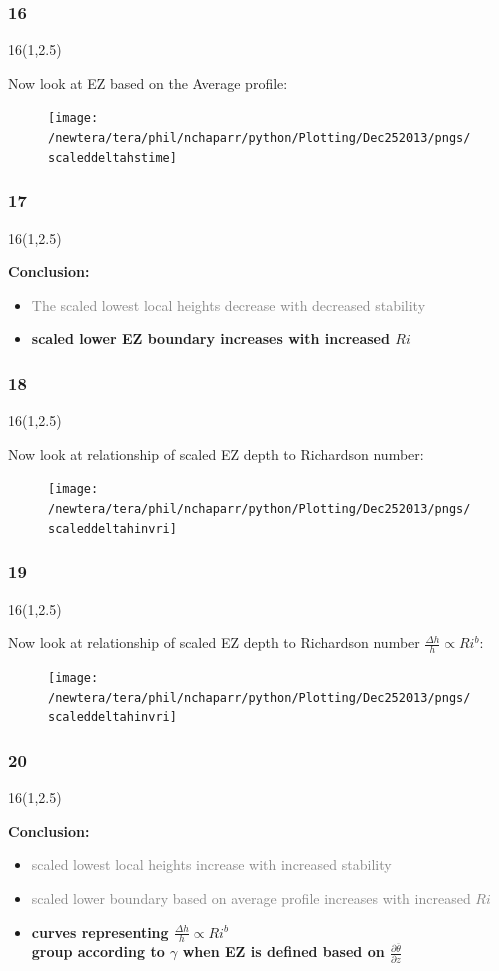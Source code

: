 \documentclass{beamer}
\newcommand\FrameText[1]{
\begin{textblock}{16}(1,2.5)
\raggedright #1
\end{textblock}}
\begin{document}
\begin{frame}
\frametitle{16}
\FrameText{Now look at EZ based on the Average profile:
}
\begin{figure}
\centering
\texttt{[image: /newtera/tera/phil/nchaparr/python/Plotting/Dec252013/pngs/scaleddeltahstime]}
\end{figure}

\end{frame}

\begin{frame}
\frametitle{17}
\FrameText{\bf{\large Conclusion:}
\begin{itemize}
\item \textcolor{gray}{The scaled lowest local heights decrease with decreased stability}
\item \bf{\large scaled lower EZ boundary increases with increased $Ri$}\\
\end{itemize}
}
\end{frame}

\begin{frame}
\frametitle{18}
\FrameText{Now look at relationship of scaled EZ depth to Richardson number:
}
\begin{figure}
\centering
\texttt{[image: /newtera/tera/phil/nchaparr/python/Plotting/Dec252013/pngs/scaleddeltahinvri]}
\end{figure}

\end{frame}

\begin{frame}
\frametitle{19}
\FrameText{Now look at relationship of scaled EZ depth to Richardson number $\frac{\Delta h}{h} \propto Ri ^{b}$:
}
\begin{figure}
\centering
\texttt{[image: /newtera/tera/phil/nchaparr/python/Plotting/Dec252013/pngs/scaleddeltahinvri]}
\end{figure}

\end{frame}

\begin{frame}
\frametitle{20}
\FrameText{\bf{\large Conclusion}:
\begin{itemize}
\item \textcolor{gray}{scaled lowest local heights increase with increased stability}
\item \textcolor{gray}{scaled lower boundary based on average profile increases with increased $Ri$} \\
\item \bf{ \large curves representing  $\frac{\Delta h}{h} \propto Ri ^{b}$}\\
\bf{ \large group according to $\gamma$ when EZ is defined based on $\frac{\partial \overline{\theta}}{\partial z}$}
\end{itemize}
}
\end{frame}
\end{document}
